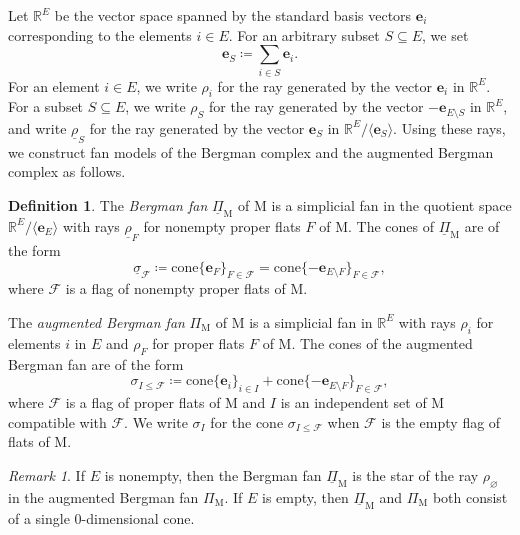 \documentclass[11pt,reqno]{amsart}
\theoremstyle{definition}
\newtheorem{definition}[theorem]{Definition}
\theoremstyle{remark}
\newtheorem{remark}[theorem]{Remark}
\renewcommand{\(}{\left(}
\renewcommand{\)}{\right)}
\newcommand{\<}{\left<}
\renewcommand{\>}{\right>}
\begin{document}

Let $\mathbb{R}^E$ be the vector space spanned  by the standard basis vectors $\mathbf{e}_i$ corresponding to the elements $i \in E$.
For an arbitrary subset $S \subseteq E$, we set
\[
\mathbf{e}_S \coloneq \sum_{i \in S}\mathbf{e}_i.
\]
For an element $i \in E$, we write $\rho_i$ for the ray generated by the vector $\mathbf{e}_i$ in $\mathbb{R}^E$.  
For a subset $S\subseteq E$, we write $\rho_S$ for the ray generated by the vector $-\mathbf{e}_{E \setminus S}$ in $\mathbb{R}^E$,
and write $\underline{\rho}_S$ for the ray generated by the vector $\mathbf{e}_S$ in $\mathbb{R}^E/\langle \mathbf{e}_S\rangle$.
Using these rays, we construct  fan models of the Bergman complex and the augmented Bergman complex  as follows.

\begin{definition}\label{DefinitionAugmentedBergmanFan}
The \emph{Bergman fan} $\underline{\Pi}_\mathrm{M}$ of $\mathrm{M}$ is a simplicial fan in the quotient space $\mathbb{R}^E / \langle \mathbf{e}_E \rangle$
with rays $\underline{\rho}_F$  for nonempty proper flats $F$ of $\mathrm{M}$.
The cones of $\underline{\Pi}_\mathrm{M}$  are of the form
\[
\underline{\sigma}_\mathscr{F} \coloneq \text{cone}\{ \mathbf{e}_F\}_{F \in \mathscr{F}} =\text{cone}\{ -\mathbf{e}_{E \setminus F}\}_{F \in \mathscr{F}},
\]
where $\mathscr{F}$ is a flag of nonempty proper flats of $\mathrm{M}$.

The \emph{augmented Bergman fan} $\Pi_\mathrm{M}$ of $\mathrm{M}$
is a simplicial fan in $\mathbb{R}^E$ with rays $\rho_i$ for elements $i$ in $E$ and $\rho_F$ for proper flats $F$ of $\mathrm{M}$.
The cones of the augmented Bergman fan are of the form
\[
\sigma_{I \le \mathscr{F}} \coloneq \text{cone}\{\mathbf{e}_i\}_{i \in I}+\text{cone}\{ -\mathbf{e}_{E \setminus F}\}_{F \in \mathscr{F}},
\]
where $\mathscr{F}$ is a flag of proper flats  of $\mathrm{M}$
and $I$ is an independent set of $\mathrm{M}$ compatible with $\mathscr{F}$.
We write $\sigma_I$ for the cone $\sigma_{I \le \mathscr{F}}$ when $\mathscr{F}$ is the empty flag of flats of $\mathrm{M}$. %
\end{definition}

\begin{remark}\label{star}
If $E$ is nonempty, then
the Bergman fan $\underline{\Pi}_{\mathrm{M}}$ is the star of the ray $\rho_\varnothing$ in the augmented Bergman fan $\Pi_{\mathrm{M}}$.
If $E$ is empty, then $\underline{\Pi}_{\mathrm{M}}$ and $\Pi_{\mathrm{M}}$ both consist of a single $0$-dimensional cone.
\end{remark}
\end{document}
